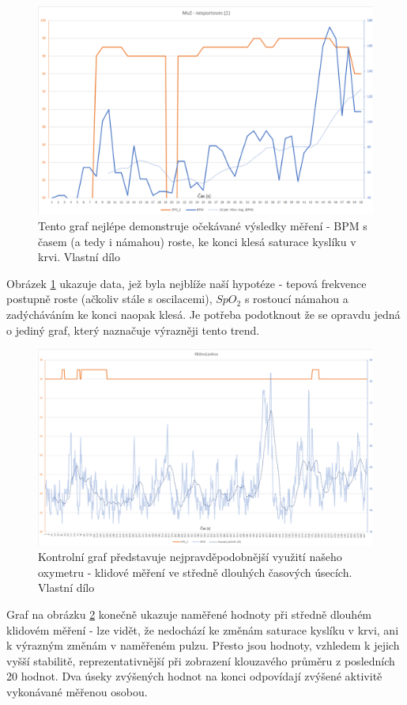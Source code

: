 \begin{figure}[ht]
\centering
  \includegraphics[scale=0.76, center]{Kapitoly/Prakticka/Obrazky/DobryGraf.png}
  \caption [Očekávaný graf muže - nesportovce]{Tento graf nejlépe demonstruje očekávané výsledky měření - BPM s časem (a tedy i námahou) roste, ke konci klesá saturace kyslíku v krvi. Vlastní dílo}
  \label{fig:Dobry}
\end{figure}
\par Obrázek \ref{fig:Dobry} ukazuje data, jež byla nejblíže naší hypotéze - tepová frekvence postupně roste (ačkoliv stále s oscilacemi), $SpO_2$ s rostoucí námahou a zadýcháváním ke konci naopak klesá. Je potřeba podotknout že se opravdu jedná o jediný graf, který naznačuje výrazněji tento trend.
\begin{figure}[ht]
\centering
  \includegraphics[scale=0.6, center]{Kapitoly/Prakticka/Obrazky/Kontrola.png}
  \caption [Kontrolní graf v klidu]{Kontrolní graf představuje nejpravděpodobnější využití našeho oxymetru - klidové měření ve středně dlouhých časových úsecích. Vlastní dílo}
  \label{fig:Control}
\end{figure}
\par Graf na obrázku \ref{fig:Control} konečně ukazuje naměřené hodnoty při středně dlouhém klidovém měření - lze vidět, že nedochází ke změnám saturace kyslíku v krvi, ani k výrazným změnám v naměřeném pulzu. Přesto jsou hodnoty, vzhledem k jejich vyšší stabilitě, reprezentativnější při zobrazení klouzavého průměru z posledních 20 hodnot. Dva úseky zvýšených hodnot na konci odpovídají zvýšené aktivitě vykonávané měřenou osobou.
